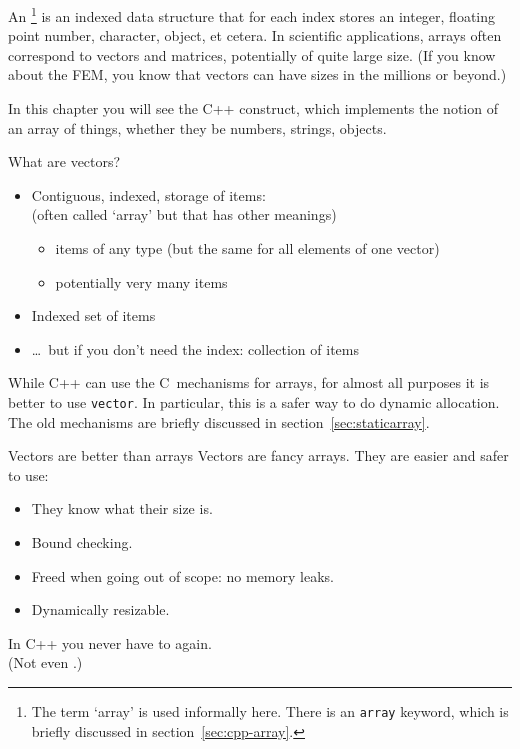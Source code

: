 
An \footnote
{The term `array' is used informally here.
  There is an \texttt{array} keyword,
  which is briefly discussed in section~\ref{sec:cpp-array}.}
is an indexed data structure that for each
index stores an integer, floating point number, character,
object, et cetera.
In scientific applications, arrays often correspond to vectors and
matrices, potentially of quite large size. (If you know about the
\acf{FEM}, you know that vectors can have sizes in the millions or beyond.)

In this chapter you will see the C++  construct,
which implements the notion of an array of things, whether they be
numbers, strings, objects.

\begin{slide}{What are vectors?}
  \label{sl:what-vector}
  \begin{itemize}
  \item Contiguous, indexed, storage of items:\\
    (often called `array' but that has other meanings)
    \begin{itemize}
    \item items of any type (but the same for all elements of one
      vector)
    \item potentially very many items
    \end{itemize}
  \item Indexed set of items
  \item \ldots~but if you don't need the index: collection of items
  \end{itemize}
\end{slide}

\begin{cnote}
  While C++ can use the C~mechanisms for arrays, for almost all purposes
  it is better to use \lstinline{vector}. In particular, this is a safer way to
  do dynamic allocation. The old
  mechanisms are briefly discussed in section~\ref{sec:staticarray}.
\end{cnote}

\begin{slide}{Vectors are better than arrays}
  \label{sl:vector-why}
  Vectors are fancy arrays. They are easier and safer to use:
  \begin{itemize}
  \item They know what their size is.
  \item Bound checking.
  \item Freed when going out of scope: no memory leaks.
  \item Dynamically resizable.
  \end{itemize}
  In C++ you never have to  again.\\
  (Not even .)
\end{slide}

